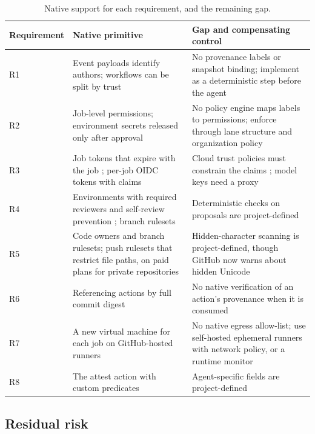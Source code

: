 \documentclass[acmsmall,screen,review]{acmart}
\begin{document}
\begin{table}[htbp]
\caption{Native support for each requirement, and the remaining gap.}
\label{tab:6}
\small
\begin{tabularx}{\linewidth}{@{}>{\hsize=0.580\hsize\raggedright\arraybackslash}X>{\hsize=1.210\hsize\raggedright\arraybackslash}X>{\hsize=1.210\hsize\raggedright\arraybackslash}X@{}}
\toprule
\textbf{Requirement} & \textbf{Native primitive} & \textbf{Gap and compensating control} \\
\midrule
R1 & Event payloads identify authors; workflows can be split by trust & No provenance labels or snapshot binding; implement as a deterministic step before the agent \\
R2 & Job-level permissions; environment secrets released only after approval \cite{githubnddeployments} & No policy engine maps labels to permissions; enforce through lane structure and organization policy \\
R3 & Job tokens that expire with the job \cite{anthropicndsecurity}; per-job OIDC tokens with claims \cite{githubndopenid} & Cloud trust policies must constrain the claims \cite{cloud2026prompt}; model keys need a proxy \\
R4 & Environments with required reviewers and self-review prevention \cite{githubnddeployments}; branch rulesets & Deterministic checks on proposals are project-defined \\
R5 & Code owners and branch rulesets; push rulesets that restrict file paths, on paid plans for private repositories \cite{githubndabout} & Hidden-character scanning is project-defined, though GitHub now warns about hidden Unicode \cite{pillar2025new} \\
R6 & Referencing actions by full commit digest & No native verification of an action's provenance when it is consumed \\
R7 & A new virtual machine for each job on GitHub-hosted runners \cite{githubndgithub} & No native egress allow-list; use self-hosted ephemeral runners with network policy, or a runtime monitor \cite{stepsecurity2025harden} \\
R8 & The attest action with custom predicates \cite{githubndactions} & Agent-specific fields are project-defined \\
\bottomrule
\end{tabularx}
\end{table}


\subsection{Residual risk}\label{sec:8.4}
\end{document}

